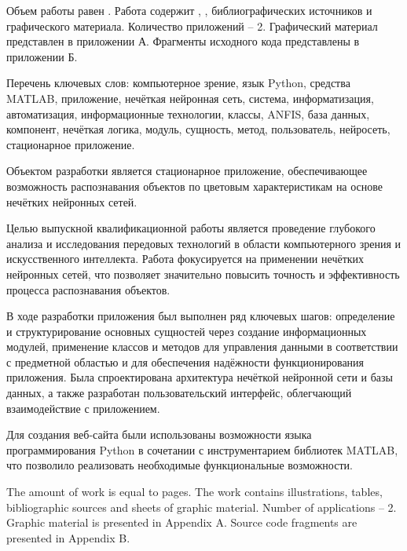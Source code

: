 
Объем работы равен . Работа содержит , ,  библиографических источников и  графического материала. Количество приложений – 2. Графический материал представлен в приложении А. Фрагменты исходного кода представлены в приложении Б.

Перечень ключевых слов: компьютерное зрение, язык Python, средства MATLAB, приложение, нечёткая нейронная сеть, система, информатизация, автоматизация, информационные технологии, классы, ANFIS, база данных, компонент, нечёткая логика, модуль, сущность, метод, пользователь, нейросеть, стационарное приложение.

Объектом разработки является стационарное приложение,  обеспечивающее возможность распознавания объектов по цветовым характеристикам на основе нечётких нейронных сетей.

Целью выпускной квалификационной работы является проведение глубокого анализа и исследования передовых технологий в области компьютерного зрения и искусственного интеллекта. Работа фокусируется на применении нечётких нейронных сетей, что позволяет значительно повысить точность и эффективность процесса распознавания объектов.

В ходе разработки приложения был выполнен ряд ключевых шагов: определение и структурирование основных сущностей через создание информационных модулей, применение классов и методов для управления данными в соответствии с предметной областью и для обеспечения надёжности функционирования приложения. Была спроектирована архитектура нечёткой нейронной сети и базы данных, а также разработан пользовательский интерфейс, облегчающий взаимодействие с приложением.

Для создания веб-сайта были использованы возможности языка программирования Python в сочетании с инструментарием библиотек MATLAB, что позволило реализовать необходимые функциональные возможности.


The amount of work is equal to  pages. The work contains  illustrations,  tables,  bibliographic sources and  sheets of graphic material. Number of applications – 2. Graphic material is presented in Appendix A. Source code fragments are presented in Appendix B.

